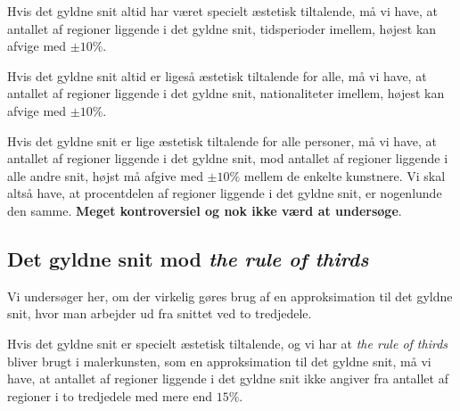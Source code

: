 {\begin{hypotese}
    Hvis det gyldne snit altid har været specielt æstetisk tiltalende,
    må vi have, at antallet af regioner liggende i det gyldne snit,
    tidsperioder imellem, højest kan afvige med $\pm10\%$.
\end{hypotese}

\begin{hypotese}
    Hvis det gyldne snit altid er ligeså  æstetisk tiltalende for alle,
    må vi have, at antallet af regioner liggende i det gyldne snit,
    nationaliteter imellem, højest kan afvige med $\pm10\%$.
\end{hypotese}

\begin{hypotese}
    Hvis det gyldne snit er lige æstetisk tiltalende for alle personer,
    må vi have, at antallet af regioner liggende i det gyldne snit, mod
    antallet af regioner liggende i alle andre snit, højst må afgive med
    $\pm10\%$ mellem de enkelte kunstnere. Vi skal altså have, at
    procentdelen af regioner liggende i det gyldne snit, er nogenlunde
    den samme.  \textbf{Meget kontroversiel og nok ikke værd
    at undersøge}.
\end{hypotese}

\subsection{Det gyldne snit mod \emph{the rule of thirds}}
Vi undersøger her, om der virkelig gøres brug af en approksimation til
det gyldne snit, hvor man arbejder ud fra snittet ved to tredjedele.

\begin{hypotese}
    Hvis det gyldne snit er specielt æstetisk tiltalende, og vi har at
    \emph{the rule of thirds} bliver brugt i malerkunsten, som en
    approksimation til det gyldne snit, må vi have, at antallet af
    regioner liggende i det gyldne snit ikke angiver fra antallet af
    regioner i to tredjedele med mere end $15\%$.
\end{hypotese}

}
